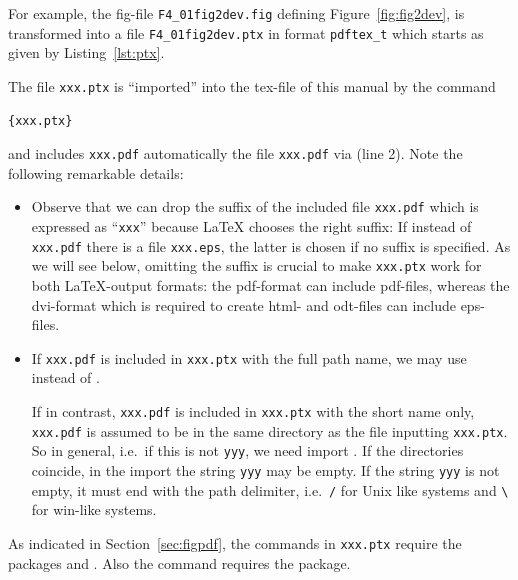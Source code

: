 \documentclass[12pt]{book}
\begin{document}
For example, 
the fig-file \texttt{F4\_01fig2dev.fig} defining Figure~\ref{fig:fig2dev}, 
is transformed into a file \texttt{F4\_01fig2dev.ptx} 
in format \texttt{pdftex\_t} which starts as given by Listing~\ref{lst:ptx}. 



The file \texttt{xxx.ptx} is ``imported'' into the tex-file of this manual 
by the command 
%
\begin{lstlisting}[language=TeX]
{xxx.ptx}
\end{lstlisting}
and includes \texttt{xxx.pdf} automatically the file \texttt{xxx.pdf} 
via  (line 2). 
Note the following remarkable details: 
%
\begin{itemize}
\item
Observe that we can drop the suffix of the included file \texttt{xxx.pdf} 
which is expressed as ``\texttt{xxx}'' 
because \LaTeX{} chooses the right suffix: 
If instead of \texttt{xxx.pdf} there is a file \texttt{xxx.eps}, 
the latter is chosen if no suffix is specified. 
As we will see below, 
omitting the suffix is crucial to make \texttt{xxx.ptx} work 
for both \LaTeX-output formats: 
the pdf-format can include pdf-files, 
whereas the dvi-format which is required to create html- and
odt-files can include eps-files. 
\item
If \texttt{xxx.pdf} is included in \texttt{xxx.ptx} 
with the full path name, 
we may use  instead of . 

If in contrast, \texttt{xxx.pdf} is included in \texttt{xxx.ptx} 
with the short name only, 
\texttt{xxx.pdf} is assumed to be in the same directory 
as the file inputting \texttt{xxx.ptx}. 
So in general, i.e.~if this is not \texttt{yyy}, we need import 
. 
If the directories coincide, 
in the import the string \texttt{yyy} may be empty. 
If the string \texttt{yyy} is not empty, it must end with the path delimiter, 
i.e.~\texttt/ for Unix like systems and 
\texttt{\textbackslash} for win-like systems. 
\end{itemize}

As indicated in Section~\ref{sec:figpdf}, 
the commands in \texttt{xxx.ptx} 
require the packages  and . 
Also the  command 
requires the  package. 
\end{document}
